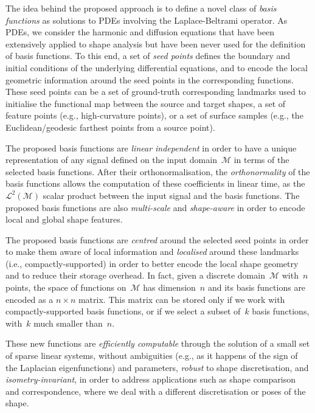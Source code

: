 \documentclass[acmtog,authorversion]{acmart}
\begin{document}
The idea behind the proposed approach is to define a novel class of \emph{basis functions} as solutions to PDEs involving the Laplace-Beltrami operator. As PDEs, we consider the harmonic and diffusion equations that have been extensively applied to shape analysis but have been never used for the definition of basis functions. To this end, a set of \emph{seed points} defines the boundary and initial conditions of the underlying differential equations, and to encode the local geometric information around the seed points in the corresponding functions. These seed points can be a set of ground-truth corresponding landmarks used to initialise the functional map between the source and target shapes, a set of feature points (e.g., high-curvature points), or a set of surface samples (e.g., the Euclidean/geodesic farthest points from a source point). 

The proposed basis functions are \emph{linear independent} in order to have a unique representation of any signal defined on the input domain~$\mathcal{M}$ in terms of the selected basis functions. After their orthonormalisation, the \emph{orthonormality} of the basis functions allows the computation of these coefficients in linear time, as the \mbox{$\mathcal{L}^{2}(\mathcal{M})$} scalar product between the input signal and the basis functions. The proposed basis functions are also \emph{multi-scale} and \emph{shape-aware} in order to encode local and global shape features.

The proposed basis functions are \emph{centred} around the selected seed points in order to make them aware of local information and \emph{localised} around these landmarks (i.e., compactly-supported) in order to better encode the local shape geometry and to reduce their storage overhead. In fact, given a discrete domain~$\mathcal{M}$ with~$n$ points, the space of functions on~$\mathcal{M}$ has dimension~$n$ and its basis functions are encoded as a \mbox{$n\times n$} matrix. This matrix can be stored only if we work with compactly-supported basis functions, or if we select a subset of~$k$ basis functions, with~$k$ much smaller than~$n$.

These new functions are \emph{efficiently computable} through the solution of a small set of sparse linear systems, without  ambiguities (e.g., as it happens of the sign of the Laplacian eigenfunctions) and parameters, \emph{robust} to shape discretisation, and \emph{isometry-invariant}, in order to address applications such as shape comparison and correspondence, where we deal with a different discretisation or poses of the shape.
\end{document}

